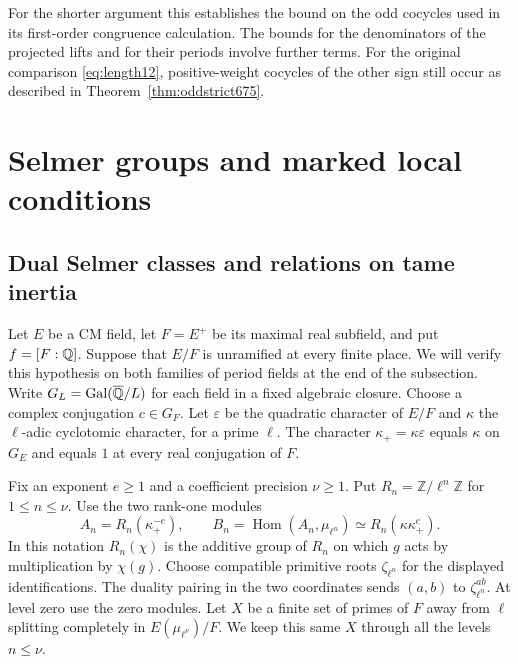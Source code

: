 \documentclass[a4paper,11pt]{article}
\theoremstyle{definition}
\theoremstyle{remark}
\newcommand{\ZZ}{\mathbb Z}\newcommand{\ord}{\operatorname{ord}}
\numberwithin{equation}{section}
\begin{document}
For the shorter argument this establishes the bound on the odd
cocycles used in its first-order congruence calculation. The
bounds for the denominators of the projected lifts and for their
periods involve further terms. For the original comparison
\eqref{eq:length12}, positive-weight cocycles of the other sign
still occur as described in Theorem~\ref{thm:oddstrict675}.
\clearpage

\section{Selmer groups and marked local conditions}\label{nav:selmer-tests}

\subsection{Dual Selmer classes and relations on tame inertia}
\label{sec:evenrelations712}

Let \(E\) be a CM field, let \(F=E^+\) be its maximal real
subfield, and put \(f=[F:\mathbb Q]\). Suppose that \(E/F\) is
unramified at every finite place. We will verify this hypothesis on
both families of period fields at the end of the subsection.
Write \(G_L=\operatorname{Gal}(\overline{\mathbb Q}/L)\) for each field in a fixed
algebraic closure. Choose a complex conjugation \(c\in G_F\).
Let \(\varepsilon\) be the quadratic character of \(E/F\) and
\(\kappa\) the \(\ell\)-adic cyclotomic character, for a prime
\(\ell\). The character \(\kappa_+=\kappa\varepsilon\) equals
\(\kappa\) on \(G_E\) and equals \(1\) at every real
conjugation of \(F\).

Fix an exponent \(e\ge1\) and a coefficient precision \(\nu\ge1\).
Put \(R_n=\ZZ/\ell^n\ZZ\) for \(1\le n\le\nu\). Use the two
rank-one modules
\[
       A_n=R_n(\kappa_+^{-e}),\qquad
       B_n=\operatorname{Hom}(A_n,\mu_{\ell^n})
           \simeq R_n(\kappa\kappa_+^e).
\]
In this notation \(R_n(\chi)\) is the additive group of \(R_n\)
on which \(g\) acts by multiplication by \(\chi(g)\). Choose
compatible primitive roots \(\zeta_{\ell^n}\) for the displayed
identifications. The duality pairing in the two coordinates sends
\((a,b)\) to \(\zeta_{\ell^n}^{ab}\). At level zero use the zero
modules. Let \(X\) be a finite set of primes of \(F\) away from
\(\ell\) splitting completely in \(E(\mu_{\ell^\nu})/F\). We
keep this same \(X\) through all the levels \(n\le\nu\).
\end{document}
